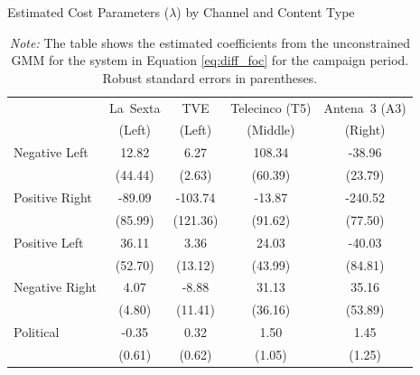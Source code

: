 \documentclass[12pt]{article}
\begin{document}
\begin{table}[!htbp]
	\caption{Estimated Cost Parameters ($\lambda$) by Channel and Content Type}
	\label{tab:costs}
	\centering\small
	\begin{tabular}{lcccc}
		\toprule
		& La~Sexta & TVE & Telecinco (T5) & Antena~3 (A3)\\
		& \scriptsize{(Left)} & \scriptsize{(Left)} & \scriptsize{(Middle)} & \scriptsize{(Right)}\\
		\midrule
		Negative Left & 12.82 & 6.27 & 108.34 & -38.96 \\
		& (44.44) & (2.63) & (60.39) & (23.79) \\
		\midrule
		Positive Right & -89.09 & -103.74 & -13.87 & -240.52 \\
		& (85.99) & (121.36) & (91.62) & (77.50) \\
		\midrule
		Positive Left & 36.11 & 3.36 & 24.03 & -40.03 \\
		& (52.70) & (13.12) & (43.99) & (84.81) \\
		\midrule
		Negative Right & 4.07 & -8.88 & 31.13 & 35.16 \\
		& (4.80) & (11.41) & (36.16) & (53.89) \\
		\midrule
		Political & -0.35 & 0.32 & 1.50 & 1.45 \\
		& (0.61) & (0.62) & (1.05) & (1.25) \\
		\midrule
		\bottomrule
	\end{tabular}
	\vspace{0.5em}
	\caption*{\small \emph{Note:} The table shows the estimated coefficients from the unconstrained GMM for the system in Equation \eqref{eq:diff_foc} for the campaign period. Robust standard errors in parentheses. }
\end{table}












\end{document}
